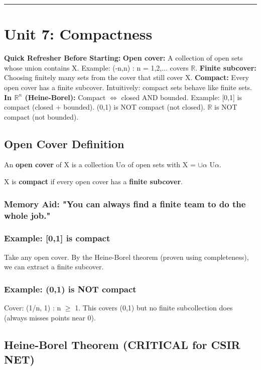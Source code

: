 \documentclass[12pt,a4paper,openany]{book}
\begin{document}
{{\bigskip\noindent\rule{\textwidth}{0.4pt}\bigskip

\section{Unit 7: Compactness }

\begin{prereqbox}
 \textbf{Quick Refresher Before Starting:}
\textbf{Open cover:} A collection of open sets whose union contains X. Example: {(-n,n) : n = 1,2,...} covers $\mathbb{R}$.
\textbf{Finite subcover:} Choosing finitely many sets from the cover that still cover X.
\textbf{Compact:} Every open cover has a finite subcover. Intuitively: compact sets behave like finite sets.
\textbf{In $\mathbb{R}^n$ (Heine-Borel):} Compact $\Longleftrightarrow$ closed AND bounded.
Example: [0,1] is compact  (closed + bounded). (0,1) is NOT compact  (not closed). $\mathbb{R}$ is NOT compact  (not bounded).
\end{prereqbox}


\subsection{Open Cover Definition}

An \textbf{open cover} of X is a collection {U$\alpha$} of open sets with X = $\cup\alpha$ U$\alpha$.

X is \textbf{compact} if every open cover has a \textbf{finite subcover}.

\subsubsection{ Memory Aid: "You can always find a finite team to do the whole job."}

\subsubsection{Example: [0,1] is compact}
Take any open cover. By the Heine-Borel theorem (proven using completeness), we can extract a finite subcover.

\subsubsection{Example: (0,1) is NOT compact}
Cover: {(1/n, 1) : n $\geq$ 1}. This covers (0,1) but no finite subcollection does (always misses points near 0).

\subsection{Heine-Borel Theorem  (CRITICAL for CSIR NET)}

}}
\end{document}
